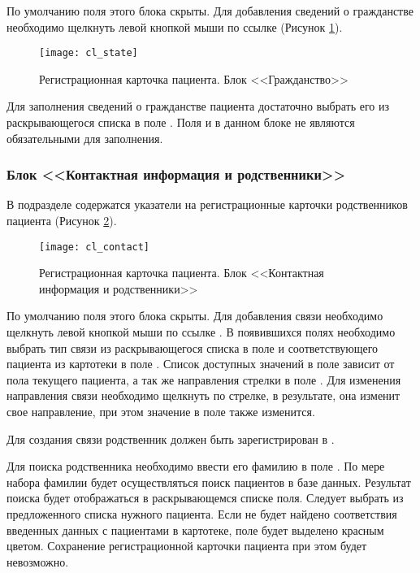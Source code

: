 {По умолчанию поля этого блока скрыты. Для добавления сведений о гражданстве необходимо щелкнуть левой кнопкой мыши по ссылке  (Рисунок \ref{img_cl_state}).

\begin{figure}[!ht]\centering
 \texttt{[image: cl\_state]}
 \caption{Регистрационная карточка пациента. Блок <<Гражданство>>}
 \label{img_cl_state}
\end{figure} 

Для заполнения сведений о гражданстве пациента достаточно выбрать его из раскрывающегося списка в поле . Поля  и  в данном блоке не являются обязательными для заполнения.
 
\subsubsection{Блок <<Контактная информация и родственники>>}

В подразделе  содержатся указатели на регистрационные карточки родственников пациента (Рисунок \ref{img_cl_contact}). 

\begin{figure}[ht!]\centering
 \texttt{[image: cl\_contact]}
 \caption{Регистрационная карточка пациента. Блок <<Контактная информация и родственники>>}
 \label{img_cl_contact}
\end{figure} 

По умолчанию поля этого блока скрыты. Для добавления связи необходимо щелкнуть левой кнопкой мыши по ссылке . В появившихся полях необходимо выбрать тип связи из раскрывающегося списка в поле  и соответствующего пациента из картотеки в поле . Список доступных значений в поле  зависит от пола текущего пациента, а так же направления стрелки в поле . Для изменения направления связи необходимо щелкнуть по стрелке, в результате, она изменит свое направление, при этом значение в поле  также изменится. 

\begin{vnim}
Для создания связи родственник должен быть зарегистрирован в \tmisp.
\end{vnim}

Для поиска родственника необходимо ввести его фамилию в поле . По мере набора фамилии будет осуществляться поиск пациентов в базе данных. Результат поиска будет отображаться в раскрывающемся списке поля. Следует выбрать из предложенного списка нужного пациента. Если не будет найдено соответствия введенных данных с пациентами в картотеке, поле  будет выделено красным цветом. Сохранение регистрационной карточки пациента при этом будет невозможно. 

}
